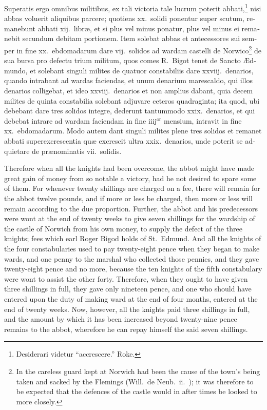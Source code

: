 \documentclass{book}
\begin{document}
\begin{paracol}{2}
\begin{otherlanguage}{latin}
Superatis ergo omnibus militibus, ex tali victoria tale lucrum poterit abbati,\footnote[\textdagger]{Desiderari videtur ``accrescere.'' Roke.} nisi abbas voluerit aliquibus parcere; quotiens xx.\ solidi ponentur super scutum, remanebunt abbati xij.\ libr\ae{}, et si plus vel minus ponatur, plus vel minus ei remanebit secundum debitam portionem. Item solebat abbas et antecessores sui semper in fine xx.\ ebdomadarum dare vij.\ solidos ad wardam castelli de Norwico\footnote[\textdagger]{In  the careless guard kept at Norwich had been the cause of the town's being taken and sacked by the Flemings (Will.\ de Neub.\ ii.\ ); it was therefore to be expected that the defences of the castle would in after times be looked to more closely.} de sua bursa pro defectu trium militum, quos comes R.\ Bigot tenet de Sancto \AE{}dmundo, et solebant singuli milites de quatuor constabiliis dare xxviij.\ denarios, quando intrabant ad wardas faciendas, et unum denarium marescaldo, qui illos denarios colligebat, et ideo xxviij.\ denarios et non amplius dabant, quia decem milites de quinta constabilia solebant adjuvare ceteros quadraginta; ita quod, ubi debebant dare tres solidos integre, dederunt tantummodo xxix.\ denarios, et qui debebat intrare ad wardam faciendam in fine iiij$^\text{or}$ mensium, intravit in fine xx.\ ebdomadarum. Modo autem dant singuli milites plene tres solidos et remanet abbati superexcrescentia qu\ae{} excrescit ultra xxix.\ denarios, unde poterit se adquietare de pr\ae{}nominatis vii.\ solidis.
\end{otherlanguage}

\switchcolumn

Therefore when all the knights had been overcome, the abbot might have made great gain of money from so notable a victory, had he not desired to spare some of them. For whenever twenty shillings are charged on a fee, there will remain for the abbot twelve pounds, and if more or less be charged, then more or less will remain according to the due proportion. Further, the abbot and his predecessors were wont at the end of twenty weeks to give seven shillings for the wardship of the castle of Norwich from his own money, to supply the defect of the three knights; fees which earl Roger Bigod holds of St.\ Edmund. And all the knights of the four constabularies used to pay twenty-eight pence when they began to make wards, and one penny to the marshal who collected those pennies, and they gave twenty-eight pence and no more, because the ten knights of the fifth constabulary were wont to assist the other forty. Therefore, when they ought to have given three shillings in full, they gave only nineteen pence, and one who should have entered upon the duty of making ward at the end of four months, entered at the end of twenty weeks. Now, however, all the knights paid three shillings in full, and the amount by which it has been increased beyond twenty-nine pence remains to the abbot, wherefore he can repay himself the said seven shillings.


\end{paracol}
\end{document}
